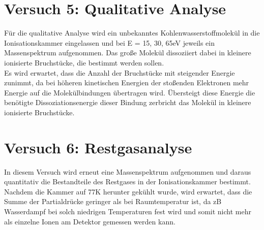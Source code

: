 \section{Versuch 5: Qualitative Analyse}

Für die qualitative Analyse wird ein unbekanntes Kohlenwasserstoffmolekül in die Ionisationskammer eingelassen und bei E = {15, 30, 65}\;eV jeweils ein Massenspektrum aufgenommen.
Das große Molekül dissoziiert dabei in kleinere ionisierte Bruchstücke, die bestimmt werden sollen.\\
Es wird erwartet, dass die Anzahl der Bruchstücke mit steigender Energie zunimmt, da bei höheren kinetischen Energien der stoßenden Elektronen mehr Energie auf die Molekülbindungen übertragen wird. 
Übersteigt diese Energie die benötigte Dissoziationsenergie dieser Bindung zerbricht das Molekül in kleinere ionisierte Bruchstücke.

\section{Versuch 6: Restgasanalyse}

In diesem Versuch wird erneut eine Massenspektrum aufgenommen und daraus quantitativ die Bestandteile des Restgases in der Ionisationskammer bestimmt.
Nachdem die Kammer auf 77\;K herunter gekühlt wurde, wird erwartet, dass die Summe der Partialdrücke geringer als bei Raumtemperatur ist, da zB Wasserdampf bei solch niedrigen Temperaturen fest wird und somit nicht mehr als einzelne Ionen am Detektor gemessen werden kann.

